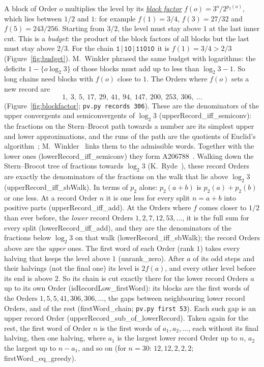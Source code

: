 \documentclass[10pt,a4paper,titlepage]{article}
\makeatletter
\newcommand{\termhere}[1]{\leavevmode
  \Hy@raisedlink{\hyper@anchorstart{term:#1}\hyper@anchorend}}
\newcommand{\keyterm}[2]{\hyperlink{box:#1}{\emph{#2}}}
\newcommand{\lean}[1]{\textsf{#1}}
\newcommand{\pv}[1]{\texttt{pv.py #1}}
\makeatother
\begin{document}
\termhere{blockfactor}A block of Order $o$ multiplies the level by its \keyterm{blockfactor}{block factor}
$f(o) = 3^{o}/2^{p_2(o)}$, which
lies between $1/2$ and $1$: for example $f(1) = 3/4$, $f(3) = 27/32$ and
$f(5) = 243/256$. Starting from $3/2$, the level must stay above $1$ at the last
inner cut. This is a \emph{budget}: the product of the block factors of all blocks
but the last must stay above $2/3$. For the chain $\text{\texttt{1}}\,|\,\text{\texttt{10}}\,|\,\text{\texttt{11010}}$ it is
$f(1) = 3/4 > 2/3$ (Figure~\ref{fig:budget}). M.~Winkler phrased the same budget with logarithms: the
deficits $1 - \{o \log_2 3\}$ of those blocks must add up to less than
$\log_2 3 - 1$. So long chains need blocks with $f(o)$ close to $1$. The Orders where
$f(o)$ sets a new record are
\[
1,\ 3,\ 5,\ 17,\ 29,\ 41,\ 94,\ 147,\ 200,\ 253,\ 306,\ \dots
\]
(Figure~\ref{fig:blockfactor}; \pv{records 306}).
These are the denominators of the upper convergents and semiconvergents of
$\log_2 3$ (\lean{upperRecord\_iff\_semiconv}): the fractions on the Stern--Brocot path towards a number are its simplest
upper and lower approximations, and the runs of the path are the quotients of Euclid's
algorithm~\cite[\S4.5, pp.~122--123]{GKP1989}; M.~Winkler~\cite{Winkler2026b} links them
to the admissible words. Together with the lower ones (\lean{lowerRecord\_iff\_semiconv}) they
form A206788~\cite{OEIS_A206788}. Walking down the Stern--Brocot tree of
fractions towards $\log_2 3$ (K.~Ryde~\cite{Ryde2020}), these record Orders are
exactly the denominators of the fractions on the walk that lie above
$\log_2 3$ (\lean{upperRecord\_iff\_sbWalk}). In terms of $p_2$ alone: $p_2(a + b)$ is
$p_2(a) + p_2(b)$ or one less. At
a record Order $n$ it is one less for every split $n = a + b$ into positive parts
(\lean{upperRecord\_iff\_add}). At the Orders where $f$ comes closer to $1/2$ than ever
before, the \emph{lower} record Orders $1, 2, 7, 12, 53, \dots$, it is the full sum for
every split (\lean{lowerRecord\_iff\_add}), and they are the denominators of the fractions
below $\log_2 3$ on that walk (\lean{lowerRecord\_iff\_sbWalk}); the record Orders above are the
\emph{upper} ones. The first word of each Order (rank $1$) takes every halving that
keeps the level above $1$ (\lean{unrank\_zero}). After $a$ of its odd steps and their
halvings (not the final one) its level is $2 f(a)$, and every other level before its end is
above $2$. So its chain is cut exactly there for the lower record Orders $a$ up to its
own Order (\lean{isRecordLow\_firstWord}): its blocks are the first words of the Orders
$1, 5, 5, 41, 306, 306, \dots$, the gaps between neighbouring lower record Orders, and
of the rest (\lean{firstWord\_chain}; \pv{first 53}). Each such gap is an upper record Order
(\lean{upperRecord\_sub\_of\_lowerRecord}). Taken again for the rest, the first word of
Order $n$ is the first words of $a_1, a_2, \dots$, each without its final halving, then one
halving, where $a_1$ is the largest lower record Order up to $n$, $a_2$ the largest up to
$n - a_1$, and so on (for $n = 30$: $12, 12, 2, 2, 2$; \lean{firstWord\_eq\_greedy}).
\end{document}
